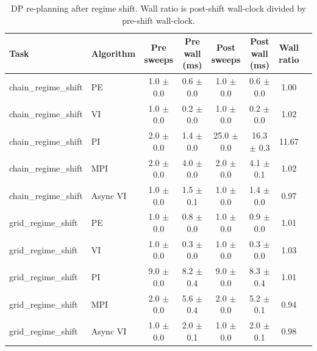 \begin{table}[t]
\centering
\caption{DP re-planning after regime shift.  Wall ratio is post-shift wall-clock divided by pre-shift wall-clock.}
\label{tab:p2b}
\begin{tabular}{llcccccc}
\toprule
Task & Algorithm & Pre sweeps & Pre wall (ms) & Post sweeps & Post wall (ms) & Wall ratio \\
\midrule
  chain\_regime\_shift & PE & 1.0 $\pm$ 0.0 & 0.6 $\pm$ 0.0 & 1.0 $\pm$ 0.0 & 0.6 $\pm$ 0.0 & 1.00 \\
  chain\_regime\_shift & VI & 1.0 $\pm$ 0.0 & 0.2 $\pm$ 0.0 & 1.0 $\pm$ 0.0 & 0.2 $\pm$ 0.0 & 1.02 \\
  chain\_regime\_shift & PI & 2.0 $\pm$ 0.0 & 1.4 $\pm$ 0.0 & 25.0 $\pm$ 0.0 & 16.3 $\pm$ 0.3 & 11.67 \\
  chain\_regime\_shift & MPI & 2.0 $\pm$ 0.0 & 4.0 $\pm$ 0.0 & 2.0 $\pm$ 0.0 & 4.1 $\pm$ 0.1 & 1.02 \\
  chain\_regime\_shift & Async VI & 1.0 $\pm$ 0.0 & 1.5 $\pm$ 0.1 & 1.0 $\pm$ 0.0 & 1.4 $\pm$ 0.0 & 0.97 \\
  grid\_regime\_shift & PE & 1.0 $\pm$ 0.0 & 0.8 $\pm$ 0.0 & 1.0 $\pm$ 0.0 & 0.9 $\pm$ 0.0 & 1.01 \\
  grid\_regime\_shift & VI & 1.0 $\pm$ 0.0 & 0.3 $\pm$ 0.0 & 1.0 $\pm$ 0.0 & 0.3 $\pm$ 0.0 & 1.03 \\
  grid\_regime\_shift & PI & 9.0 $\pm$ 0.0 & 8.2 $\pm$ 0.4 & 9.0 $\pm$ 0.0 & 8.3 $\pm$ 0.4 & 1.01 \\
  grid\_regime\_shift & MPI & 2.0 $\pm$ 0.0 & 5.6 $\pm$ 0.4 & 2.0 $\pm$ 0.0 & 5.2 $\pm$ 0.1 & 0.94 \\
  grid\_regime\_shift & Async VI & 1.0 $\pm$ 0.0 & 2.0 $\pm$ 0.1 & 1.0 $\pm$ 0.0 & 2.0 $\pm$ 0.1 & 0.98 \\
\bottomrule
\end{tabular}
\end{table}
